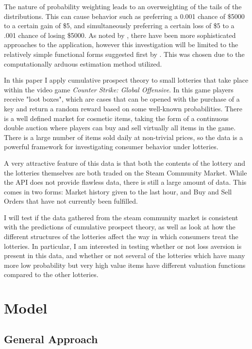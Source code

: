 \documentclass[12pt, letterpaper]{paper}
\begin{document}
The nature of probability weighting leads to an overweighting of the
tails of the distributions. This can cause behavior such as preferring
a 0.001 chance of \$5000 to a certain gain of \$5, and simultaneously
preferring a certain loss of \$5 to a .001 chance of losing \$5000. As
noted by \cite{LitReview}, there have been more sophisticated approaches
to the application, however this investigation will be limited to the
relatively simple functional forms suggested first by \cite{Kahn}. This
was chosen due to the computationally arduous estimation method
utilized.

In this paper I apply cumulative prospect theory to small lotteries
that take place within the video game \emph{Counter Strike: Global
Offensive}. In this game players receive "loot boxes", which are cases
that can be opened with the purchase of a key and return a random
reward based on some well-known probabilities. There is a well defined
market for cosmetic items, taking the form of a continuous
double auction where players can buy and sell virtually all items in
the game. There is a large number of items sold daily at non-trivial
prices, so the data is a powerful framework for investigating consumer
behavior under lotteries.

A very attractive feature of this data is that both the contents of
the lottery and the lotteries themselves are both traded on the Steam
Community Market. While the API does not provide flawless data, there
is still a large amount of data. This comes in two forms: Market
history given to the last hour, and Buy and Sell Orders that have not
currently been fulfilled.

I will test if the data gathered from the steam community market
is consistent with the predictions of cumulative prospect theory, as
well as look at how the different structures of the lotteries
affect the way in which consumers treat the lotteries. In particular,
I am interested in testing whether or not loss aversion is present in
this data, and whether or not several of the lotteries which have many
more low probability but very high value items have different valuation
functions compared to the other lotteries.

\section{Model}
\label{sec-2}
\subsection{General Approach}
\label{sec-2-1}
\end{document}
